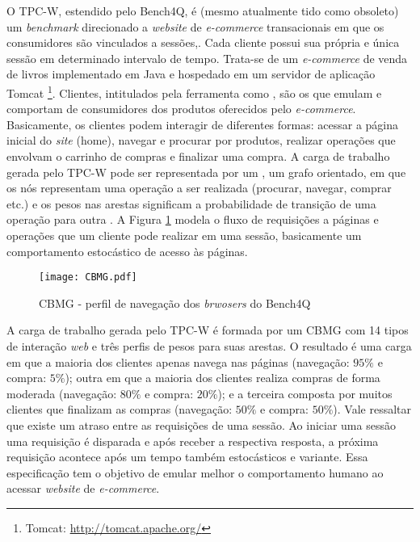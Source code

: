 O TPC-W, estendido pelo Bench4Q, é (mesmo atualmente tido como obsoleto) um \textit{benchmark} direcionado a \textit{website} de \textit{e-commerce} transacionais em que os consumidores são vinculados a sessões,. Cada cliente possui sua própria e única sessão em determinado intervalo de tempo. Trata-se de um \textit{e-commerce} de venda de livros implementado em Java e hospedado em um servidor de aplicação Tomcat \footnote{Tomcat: \url{http://tomcat.apache.org/}}. Clientes, intitulados pela ferramenta como , são os que emulam e comportam de consumidores dos produtos oferecidos pelo \textit{e-commerce}. Basicamente, os clientes podem interagir de diferentes formas: acessar a página inicial do \textit{site} (home), navegar e procurar por produtos, realizar operações que envolvam o carrinho de compras e finalizar uma compra. A carga de trabalho gerada pelo TPC-W pode ser representada por um , um grafo orientado, em que os nós representam uma operação a ser realizada (procurar, navegar, comprar etc.) e os pesos nas arestas significam a probabilidade de transição de uma operação para outra \cite{Zhang2011}. A Figura \ref{fig:CBMG} modela o fluxo de requisições a páginas e operações que um cliente pode realizar em uma sessão, basicamente um comportamento estocástico de acesso às páginas.

\begin{figure}[htb]
	\centering
	\texttt{[image: CBMG.pdf]}
	\caption{CBMG - perfil de navegação dos \textit{brwosers} do Bench4Q}
	\label{fig:CBMG}
\end{figure}


A carga de trabalho gerada pelo TPC-W é formada por um CBMG com 14 tipos de interação \textit{web} e três perfis de pesos para suas arestas. O resultado é uma carga em que a maioria dos clientes apenas navega nas páginas (navegação: $95\%$ e compra: $5\%$); outra em que a maioria dos clientes realiza compras de forma moderada (navegação: $80\%$ e compra: $20\%$); e a terceira composta por muitos clientes que finalizam as compras (navegação: $50\%$ e compra: $50\%$). Vale ressaltar que existe um atraso entre as requisições de uma sessão. Ao iniciar uma sessão uma requisição é disparada e após receber a respectiva resposta, a próxima requisição acontece após um tempo também estocásticos e variante. Essa especificação tem o objetivo de emular melhor o comportamento humano ao acessar \textit{website} de \textit{ e-commerce}.

